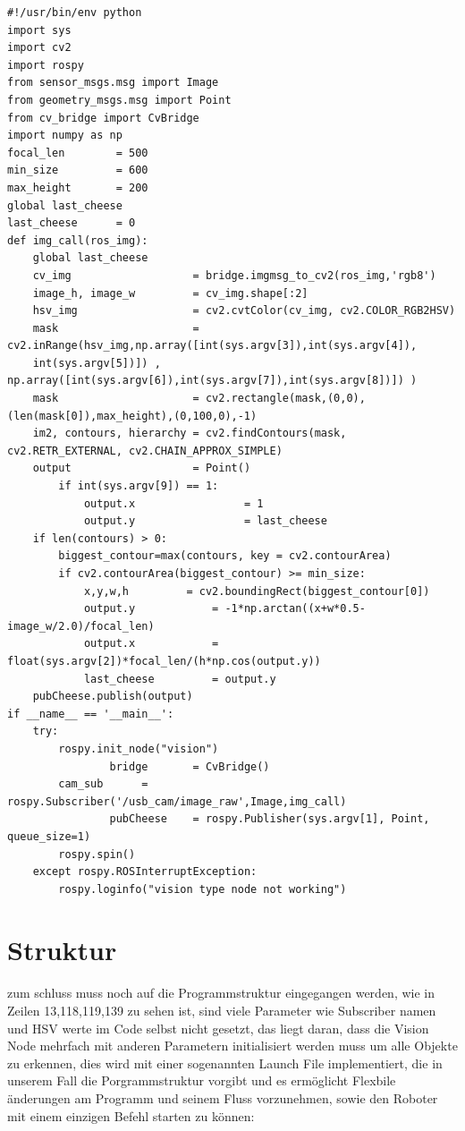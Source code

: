 \documentclass[11pt,a4paper]{article}
\begin{document}
\begin{tiny}
\begin{linenumbers}
\begin{lstlisting}
#!/usr/bin/env python
import sys
import cv2
import rospy
from sensor_msgs.msg import Image
from geometry_msgs.msg import Point
from cv_bridge import CvBridge
import numpy as np
focal_len        = 500
min_size         = 600
max_height       = 200
global last_cheese
last_cheese      = 0
def img_call(ros_img):
	global last_cheese
	cv_img                   = bridge.imgmsg_to_cv2(ros_img,'rgb8')
	image_h, image_w         = cv_img.shape[:2]
	hsv_img                  = cv2.cvtColor(cv_img, cv2.COLOR_RGB2HSV)
	mask                     = cv2.inRange(hsv_img,np.array([int(sys.argv[3]),int(sys.argv[4]),
	int(sys.argv[5])]) , np.array([int(sys.argv[6]),int(sys.argv[7]),int(sys.argv[8])]) )
	mask                     = cv2.rectangle(mask,(0,0),(len(mask[0]),max_height),(0,100,0),-1)
	im2, contours, hierarchy = cv2.findContours(mask, cv2.RETR_EXTERNAL, cv2.CHAIN_APPROX_SIMPLE)
	output                   = Point()
        if int(sys.argv[9]) == 1:
            output.x                 = 1
            output.y                 = last_cheese
	if len(contours) > 0:
		biggest_contour=max(contours, key = cv2.contourArea)
		if cv2.contourArea(biggest_contour) >= min_size:
			x,y,w,h         = cv2.boundingRect(biggest_contour[0])
			output.y            = -1*np.arctan((x+w*0.5-image_w/2.0)/focal_len)
			output.x            = float(sys.argv[2])*focal_len/(h*np.cos(output.y))
			last_cheese         = output.y
	pubCheese.publish(output)
if __name__ == '__main__':
	try:
		rospy.init_node("vision")
                bridge       = CvBridge()
		cam_sub      = rospy.Subscriber('/usb_cam/image_raw',Image,img_call)
                pubCheese    = rospy.Publisher(sys.argv[1], Point, queue_size=1)
		rospy.spin()
	except rospy.ROSInterruptException:
		rospy.loginfo("vision type node not working")

\end{lstlisting}
	\end{linenumbers}
\end{tiny}
\section{Struktur}
zum schluss muss noch auf die Programmstruktur eingegangen werden, wie in Zeilen 13,118,119,139 zu sehen ist, sind viele Parameter wie Subscriber namen und HSV werte im Code selbst nicht gesetzt, das liegt daran, dass die Vision Node mehrfach mit anderen Parametern initialisiert werden muss um alle Objekte zu erkennen, dies wird mit einer sogenannten Launch File implementiert, die in unserem Fall die Porgrammstruktur vorgibt und es ermöglicht Flexbile änderungen am Programm und seinem Fluss vorzunehmen, sowie den Roboter mit einem einzigen Befehl starten zu können:
\end{document}
